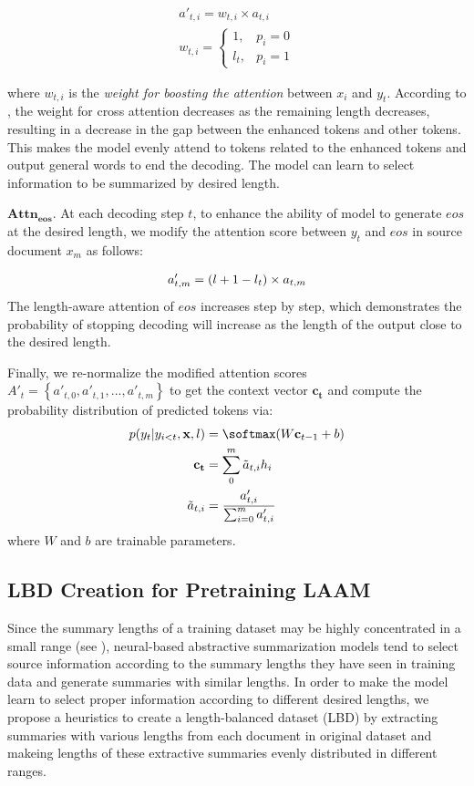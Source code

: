 \begin{align}
	a'_{t,i}=w_{t,i} \times a_{t,i} \\
	w_{t,i}=
		\begin{cases}			
	 		1, &\mbox{$p_i=0$}\\	\label{eq:w}		
	 		l_t, &\mbox{$p_i=1$}			
	 	\end{cases}	
\end{align}

where $w_{t,i}$ is the {\em weight for boosting the attention} between $x_i$ and $y_t$.
According to ,  
the weight for cross attention decreases as the remaining length decreases,
resulting in a decrease in the gap between the enhanced tokens and other tokens. 
This makes the model evenly attend to tokens related to the enhanced tokens and output general words to end the decoding.
The model can learn to select information to be summarized by desired length.


$\bm{Attn_{eos}}$.  At each decoding step $t$, to enhance the ability of model to generate $eos$ at the desired length,
we modify the attention score between $y_t$ and $eos$ in source document $x_m$ as follows:

\begin{equation}
 	a'_{t,m}=(l+1-l_t) \times a_{t,m} \\
\end{equation}
The length-aware attention of $eos$ increases step by step, 
which demonstrates the probability of stopping decoding will increase
as the length of the output close to the desired length.

Finally, we re-normalize the modified attention scores 
$A'_t=\left\{a'_{t,0}, a'_{t,1},...,a'_{t,m}\right\}$ to get the context vector $\mathbf{c_t}$ and compute the probability distribution of 
predicted tokens via:
\begin{align}
	p(y_t|y_{i<t},\mathbf{x},l) &=\softmax(W \mathbf{c}_{t-1}+b) \\
	\mathbf{c_t} &=\sum_{0}^{m} \tilde{a}_{t,i} h_i \\
	\tilde{a}_{t,i} &= \frac{a'_{t,i}}{\sum_{i=0}^{m}a'_{t,i}}
\end{align}
where $W$ and $b$ are trainable parameters.


\subsection{LBD Creation for Pretraining LAAM}
\label{sec:lbd}
Since the summary lengths of a training dataset may be highly concentrated in a small range (see ), 
neural-based abstractive summarization models 
tend to select source information according to the summary lengths they have seen in training data and generate summaries with similar lengths.
In order to make the model learn to select proper information according to different desired lengths,
we propose a heuristics to create a length-balanced dataset (LBD) by extracting summaries with various lengths from each document in original dataset and makeing lengths of these extractive summaries evenly distributed in different ranges. 

